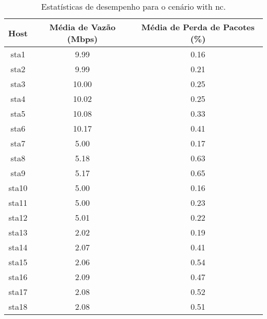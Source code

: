 \begin{table}[htbp]
    \centering
    \label{tab:with_nc_stats}
    \begin{tabular}{|c|c|c|}
        \hline
        \textbf{Host} & \textbf{Média de Vazão (Mbps)} & \textbf{Média de Perda de Pacotes (\%)} \\ \hline
        sta1 & 9.99 & 0.16 \\ \hline
        sta2 & 9.99 & 0.21 \\ \hline
        sta3 & 10.00 & 0.25 \\ \hline
        sta4 & 10.02 & 0.25 \\ \hline
        sta5 & 10.08 & 0.33 \\ \hline
        sta6 & 10.17 & 0.41 \\ \hline
        sta7 & 5.00 & 0.17 \\ \hline
        sta8 & 5.18 & 0.63 \\ \hline
        sta9 & 5.17 & 0.65 \\ \hline
        sta10 & 5.00 & 0.16 \\ \hline
        sta11 & 5.00 & 0.23 \\ \hline
        sta12 & 5.01 & 0.22 \\ \hline
        sta13 & 2.02 & 0.19 \\ \hline
        sta14 & 2.07 & 0.41 \\ \hline
        sta15 & 2.06 & 0.54 \\ \hline
        sta16 & 2.09 & 0.47 \\ \hline
        sta17 & 2.08 & 0.52 \\ \hline
        sta18 & 2.08 & 0.51 \\ \hline
    \end{tabular}
    \caption{Estatísticas de desempenho para o cenário with nc.}
\end{table}

